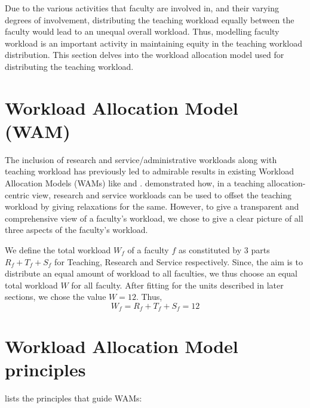 \label{chapter:rts_ratio}


Due to the various activities that faculty are involved in, and their varying degrees of involvement, distributing the teaching workload equally between the faculty would lead to an unequal overall workload. Thus, modelling faculty workload is an important activity in maintaining equity in the teaching workload distribution. This section delves into the workload allocation model used for distributing the teaching workload.

\section{Workload Allocation Model (WAM)}
The inclusion of research and service/administrative workloads along with teaching workload has previously led to admirable results in existing Workload Allocation Models (WAMs) like \parencite{finlay1994management} and \parencite{griffith2020framework}. \parencite{rohan2017} demonstrated how, in a teaching allocation-centric view, research and service workloads can be used to offset the teaching workload by giving relaxations for the same. However, to give a transparent and comprehensive view of a faculty's workload, we chose to give a clear picture of all three aspects of the faculty's workload.

We define the total workload \(W_f\) of a faculty \(f\) as constituted by 3 parts \(R_f + T_f + S_f\) for Teaching, Research and Service respectively. Since, the aim is to distribute an equal amount of workload to all faculties, we thus choose an equal total workload \(W\) for all faculty. After fitting for the units described in later sections, we chose the value \(W = 12\). Thus,
\[W_f = R_f + T_f + S_f = 12\]
\section{Workload Allocation Model principles}

\parencite{trac2011} lists the principles that guide WAMs:

